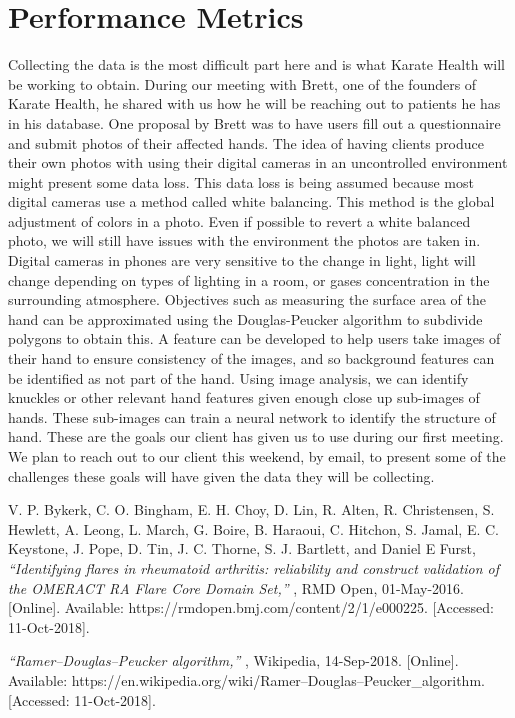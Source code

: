 \documentclass[10pt,journal,draftclsnofoot,onecolumn]{IEEEtran}
\begin{document}
\section{Performance Metrics}
Collecting the data is the most difficult part here and is what Karate Health will be working to obtain. During our meeting with Brett, one of the founders of Karate Health, he shared with us how he will be reaching out to patients he has in his database. One proposal by Brett was to have users fill out a questionnaire and submit photos of their affected hands. The idea of having clients produce their own photos with using their digital cameras in an uncontrolled environment might present some data loss. This data loss is being assumed because most digital cameras use a method called white balancing. This method is the global adjustment of colors in a photo. Even if possible to revert a white balanced photo, we will still have issues with the environment the photos are taken in. Digital cameras in phones are very sensitive to the change in light, light will change depending on types of lighting in a room, or gases concentration in the surrounding atmosphere.
Objectives such as measuring the surface area of the hand can be approximated using the Douglas-Peucker algorithm to subdivide polygons to obtain this.
A feature can be developed to help users take images of their hand to ensure consistency of the images, and so background features can be identified as not part of the hand.
Using image analysis, we can identify knuckles or other relevant hand features given enough close up sub-images of hands. These sub-images can train a neural network to identify the structure of hand.
These are the goals our client has given us to use during our first meeting. We plan to reach out to our client this weekend, by email, to present some of the challenges these goals will have given the data they will be collecting.

\begin{thebibliography}{1}
V. P. Bykerk, C. O. Bingham, E. H. Choy, D. Lin, R. Alten, R. Christensen, S. Hewlett, A. Leong, L. March, G. Boire, B. Haraoui, C. Hitchon, S. Jamal, E. C. Keystone, J. Pope, D. Tin, J. C. Thorne, S. J. Bartlett, and Daniel E Furst,  \emph{ “Identifying flares in rheumatoid arthritis: reliability and construct validation of the OMERACT RA Flare Core Domain Set,” }, RMD Open, 01-May-2016. [Online]. Available: https://rmdopen.bmj.com/content/2/1/e000225. [Accessed: 11-Oct-2018].

\emph {“Ramer–Douglas–Peucker algorithm,” }, Wikipedia, 14-Sep-2018. [Online]. Available: https://en.wikipedia.org/wiki/Ramer–Douglas–Peucker\_algorithm. [Accessed: 11-Oct-2018].
\end{thebibliography}
\end{document}
